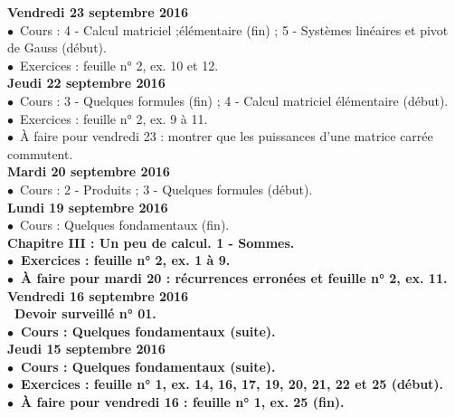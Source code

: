 \documentclass[12pt,a4paper]{article}
\begin{document}
\noindent\textbf{Vendredi 23 septembre 2016 }\\
$\bullet$\ Cours : 4 - Calcul matriciel ;élémentaire (fin) ; 5 - Systèmes linéaires et pivot de Gauss (début).\\
$\bullet$\ Exercices : feuille n° 2, ex. 10 et 12.\vspace{.4cm}\\

\noindent\textbf{Jeudi 22 septembre 2016 }\\
$\bullet$\ Cours : 3 - Quelques formules (fin) ; 4 - Calcul matriciel
élémentaire (début).\\
$\bullet$\ Exercices : feuille n° 2, ex. 9 à 11.\\
$\bullet$\ À faire pour vendredi 23 : montrer que les puissances d'une matrice carrée commutent.\vspace{.4cm}\\

\noindent\textbf{\bf Mardi 20 septembre 2016 }\\
$\bullet$\ Cours : 2 - Produits ; 3 - Quelques formules (début).\vspace{.4cm}\\

\noindent\textbf{Lundi 19 septembre 2016 }\\
$\bullet$\ Cours : Quelques fondamentaux (fin).\\
\bf Chapitre III \rm : Un peu de calcul. 1 - Sommes.\\
$\bullet$\ Exercices : feuille n° 2, ex. 1 à 9.\\
$\bullet$\ À faire pour mardi 20 : récurrences erronées et feuille n° 2, ex. 11.\vspace{.4cm}\\

\noindent\textbf{Vendredi 16 septembre 2016 }\\
\bu\ Devoir surveillé n° 01.\\
$\bullet$\ Cours : Quelques fondamentaux (suite).\vspace{.4cm}\\

\noindent\textbf{Jeudi 15 septembre 2016 }\\
$\bullet$\ Cours : Quelques fondamentaux (suite).\\
$\bullet$\ Exercices : feuille n° 1, ex. 14, 16, 17, 19, 20, 21, 22 et 25 (début).\\
$\bullet$\ À faire pour vendredi 16 : feuille n° 1, ex. 25 (fin).\vspace{.4cm}\\
 
\end{document}
